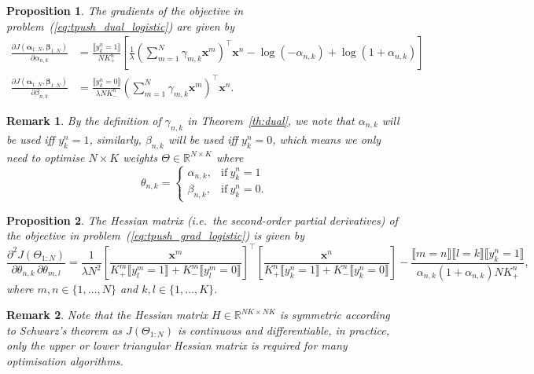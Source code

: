\documentclass[9pt]{extarticle}
\newtheorem{proposition}{Proposition}
\newtheorem{remark}{Remark}
\newcommand{\llb}{\llbracket}
\newcommand{\rrb}{\rrbracket}
\newcommand{\x}{\mathbf{x}}
\newcommand{\1}{\mathbf{1}}
\newcommand{\R}{\mathbb{R}}
\newcommand{\alphabm}{\bm{\alpha}}
\newcommand{\betabm}{\bm{\beta}}
\newcommand{\ie}{i.e.\ }
\begin{document}
\begin{proposition}
\label{prop:gradient}
The gradients of the objective in problem~(\ref{eq:tpush_dual_logistic}) are given by
\begin{equation}
\label{eq:tpush_grad_logistic}
\begin{aligned}
\frac{\partial J(\alphabm_{1:N}, \betabm_{1:N})} {\partial \alpha_{n,k}}
&= \frac{\llb y_k^n = 1 \rrb} {N K_+^n} \left[ \frac{1}{\lambda} \left( \sum_{m=1}^N \gamma_{m,k} \x^m \right)^\top \x^n 
   - \log(-\alpha_{n,k}) + \log(1 + \alpha_{n,k}) \right] \\
%
\frac{\partial J(\alphabm_{1:N}, \betabm_{1:N})} {\partial \beta_{n,k}}
&= \frac{\llb y_k^n = 0 \rrb} {\lambda N K_-^n} \left( \sum_{m=1}^N \gamma_{m,k} \x^m \right)^\top \x^n.
\end{aligned}
\end{equation}
\end{proposition}
%
\begin{remark}
By the definition of $\gamma_{n,k}$ in Theorem~\ref{th:dual}, 
we note that $\alpha_{n,k}$ will be used \emph{iff} $y_k^n = 1$, similarly, $\beta_{n,k}$ will be used \emph{iff} $y_k^n = 0$,
which means we only need to optimise $N \times K$ weights $\Theta \in \R^{N \times K}$ where
$$
\theta_{n,k} = 
\begin{cases}
\alpha_{n,k}, & \text{if} \ y_k^n = 1 \\
\beta_{n,k},  & \text{if} \ y_k^n = 0.
\end{cases}
$$
\end{remark}
%
\begin{proposition}
\label{prop:hessian}
The Hessian matrix (\ie the second-order partial derivatives) of the objective in problem~(\ref{eq:tpush_grad_logistic}) is given by
$$
\frac{\partial^2 J(\Theta_{1:N})} {\partial \theta_{n,k} \, \partial \theta_{m,l}} 
= \frac{1} {\lambda N^2} 
  \left[ \frac{\x^m} {K_+^m \llb y_l^m = 1 \rrb + K_-^m \llb y_l^m = 0 \rrb} \right]^\top
  \left[ \frac{\x^n} {K_+^n \llb y_k^n = 1 \rrb + K_-^n \llb y_k^n = 0 \rrb} \right] - \frac{\llb m = n \rrb \llb l = k \rrb \llb y_k^n = 1 \rrb}
  {\alpha_{n,k} (1 + \alpha_{n,k}) N K_+^n},
$$
where $m, n \in \{1,\dots,N\}$ and $k, l \in \{1,\dots,K\}$. 
\end{proposition}

\begin{remark}
Note that the Hessian matrix $H \in \R^{NK \times NK}$ is \emph{symmetric} 
according to Schwarz's theorem as $J(\Theta_{1:N})$ is continuous and differentiable,
in practice, only the upper or lower triangular Hessian matrix is required for many optimisation algorithms. 
\end{remark}
\end{document}
